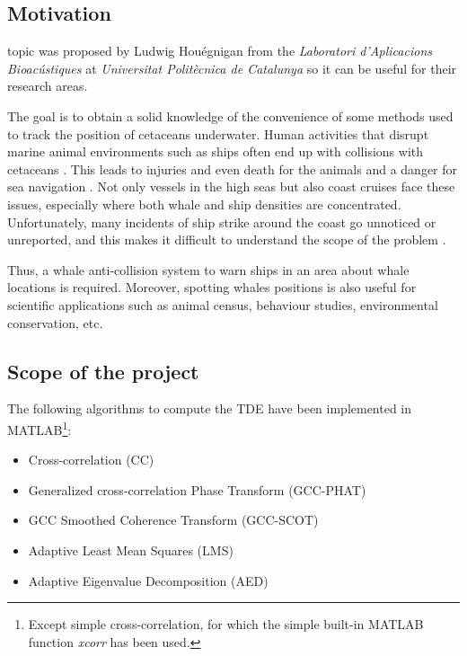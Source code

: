% 
% 
% 
% 
\subsection{Motivation}
   topic was proposed by Ludwig Houégnigan from the \textit{Laboratori d'Aplicacions Bioacústiques} at \textit{Universitat Politècnica de Catalunya} so it can be useful for their research areas.

  The goal is to obtain a solid knowledge of the convenience of some methods used to track the position of cetaceans underwater. Human activities that disrupt marine animal environments such as ships often end up with collisions with cetaceans \cite{collisions}. This leads to injuries and even death for the animals and a danger for sea navigation \cite{youtube-collisions}. Not only vessels in the high seas but also coast cruises face these issues, especially where both whale and ship densities are concentrated. Unfortunately, many incidents of ship strike around the coast go unnoticed or unreported, and this makes it difficult to understand the scope of the problem \cite{web-collisions}.

  Thus, a whale anti-collision system to warn ships in an area about whale locations is required. Moreover, spotting whales positions is also useful for scientific applications such as animal census, behaviour studies, environmental conservation, etc.

\subsection{Scope of the project}
  The following algorithms to compute the TDE have been implemented in MATLAB\footnote{Except simple cross-correlation, for which the simple built-in MATLAB function \emph{xcorr} has been used.}:
  \begin{itemize}
    \item Cross-correlation (CC)
    \item Generalized cross-correlation Phase Transform (GCC-PHAT)
    \item GCC Smoothed Coherence Transform (GCC-SCOT)
    \item Adaptive Least Mean Squares (LMS)
    \item Adaptive Eigenvalue Decomposition (AED)
  \end{itemize}
  \vspace{5pt}
  

